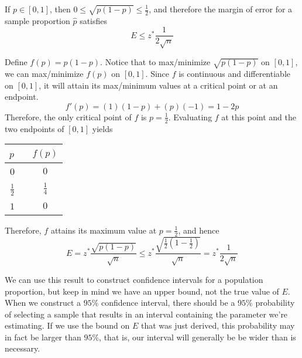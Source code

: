 \begin{prop} If $p \in [0,1]$, then $0 \leq \sqrt{p(1-p)} \leq \frac{1}{2}$, and therefore the margin of error for a sample proportion $\widehat{p}$ satisfies
$$\boxed{E \leq z^*  \frac{1}{2\sqrt{n}}}$$
\end{prop}
\begin{pf} Define $f(p) = p(1-p)$. Notice that to max/minimize $\sqrt{p(1-p)}$ on $[0,1]$, we can max/minimize $f(p)$ on $[0,1]$. Since $f$ is continuous and differentiable on $[0,1]$, it will attain its max/minimum values at a critical point or at an endpoint.
$$f'(p) = (1)(1-p) + (p)(-1) = 1 - 2p$$
Therefore, the only critical point of $f$ is $p = \frac{1}{2}$. Evaluating $f$ at this point and the two endpoints of $[0,1]$ yields
\vspace*{-0.1in}
\begin{center}
\def\arraystretch{1.5}%
\begin{tabular}{c|c}
$p$ \ & $f(p)$ \\
\hline
$0$ \ & $0$ \\
$\frac{1}{2}$ \ & $\frac{1}{4}$ \\
$1$ \ & $0$ \\
\end{tabular}
\end{center}
\vspace*{-0.05in}
Therefore, $f$ attains its maximum value at $p = \frac{1}{2}$, and hence
$$E = z^*   \frac{\sqrt{p(1-p)}}{\sqrt{n}} \leq z^*  \frac{\sqrt{\frac{1}{2}(1 -\frac{1}{2})}}{\sqrt{n}} = z^*  \frac{1}{2\sqrt{n}}$$
\end{pf}
\par
We can use this result to construct confidence intervals for a population proportion, but keep in mind we have an upper bound, not the true value of $E$. When we construct a $95\%$ confidence interval, there should be a $95\%$ probability of selecting a sample that results in an interval containing the parameter we're estimating. If we use the bound on $E$ that was just derived, this probability may in fact be larger than $95\%$, that is, our interval will generally be be wider than is necessary.
\par
